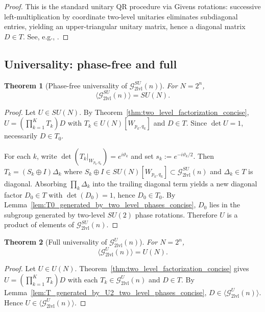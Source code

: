 \documentclass{article}%
\newtheorem{theorem}{Theorem}[section]
\theoremstyle{definition}
\numberwithin{equation}{section}
\begin{document}
\begin{proof}
This is the standard unitary QR procedure via Givens rotations: successive left-multiplication by coordinate two-level unitaries
eliminates subdiagonal entries, yielding an upper-triangular unitary matrix, hence a diagonal matrix $D\in T$.
See, e.g., \cite{GolubVanLoan2013,Higham2008,HornJohnson2013}.
\end{proof}

\subsection{Universality: phase-free and full}
\label{subsec:universality_phase_free_full}

\begin{theorem}[Phase-free universality of $\mathcal{G}^{SU}_{\mathrm{2lvl}}(n)$]
\label{thm:SU_two_level_universal_concise}
For $N=2^n$,
\[
\big\langle \mathcal{G}^{SU}_{\mathrm{2lvl}}(n)\big\rangle = SU(N).
\]
\end{theorem}

\begin{proof}
Let $U\in SU(N)$. By Theorem~\ref{thm:two_level_factorization_concise},
$U=(\prod_{k=1}^K T_k)D$ with $T_k\in U(N)[W_{p_k,q_k}]$ and $D\in T$. Since $\det U=1$, necessarily $D\in T_0$.

For each $k$, write $\det(T_k|_{W_{p_k,q_k}})=e^{i\vartheta_k}$ and set $s_k:=e^{-i\vartheta_k/2}$.
Then $T_k=(S_k\oplus I)\Delta_k$ where $S_k\oplus I\in SU(N)[W_{p_k,q_k}]\subset\mathcal{G}^{SU}_{\mathrm{2lvl}}(n)$ and $\Delta_k\in T$
is diagonal. Absorbing $\prod_k\Delta_k$ into the trailing diagonal term yields a new diagonal factor $D_0\in T$ with $\det(D_0)=1$,
hence $D_0\in T_0$. By Lemma~\ref{lem:T0_generated_by_two_level_phases_concise}, $D_0$ lies in the subgroup generated by two-level
$SU(2)$ phase rotations. Therefore $U$ is a product of elements of $\mathcal{G}^{SU}_{\mathrm{2lvl}}(n)$.
\end{proof}

\begin{theorem}[Full universality of $\mathcal{G}^{U}_{\mathrm{2lvl}}(n)$]
\label{thm:U_two_level_universal_concise}
For $N=2^n$,
\[
\big\langle \mathcal{G}^{U}_{\mathrm{2lvl}}(n)\big\rangle = U(N).
\]
\end{theorem}

\begin{proof}
Let $U\in U(N)$. Theorem~\ref{thm:two_level_factorization_concise} gives $U=(\prod_{k=1}^K T_k)D$ with each
$T_k\in \mathcal{G}^{U}_{\mathrm{2lvl}}(n)$ and $D\in T$. By Lemma~\ref{lem:T_generated_by_U2_two_level_phases_concise},
$D\in\langle \mathcal{G}^{U}_{\mathrm{2lvl}}(n)\rangle$. Hence $U\in\langle \mathcal{G}^{U}_{\mathrm{2lvl}}(n)\rangle$.
\end{proof}
\end{document}
